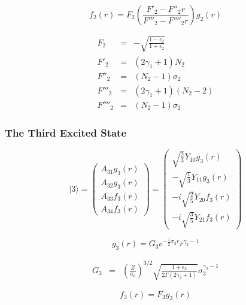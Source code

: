 \documentclass[a4paper,titlepage]{report}
\newcommand{\ket}[1]{|#1 \rangle}
\begin{document}
\begin{equation}
	\boxed{
		f_2(r) = F_2 
				 \left(
				 	\frac{F'_2 - F''_2 r}{F'''_2 - F''''_2 r}
				 \right) g_2(r)
	}
\end{equation}

\begin{eqnarray*}
	F_2		& = & -\sqrt{\frac{1-\epsilon_2}{1+\epsilon_2}} \\
	F'_2	& = & (2\gamma_1 + 1)N_2 \\
	F''_2 	& = & (N_2 - 1)\sigma_2 \\
	F'''_2 	& = & (2\gamma_1 + 1)(N_2 - 2) \\
	F''''_2 & = & (N_2 - 1)\sigma_2
\end{eqnarray*}

		\subsubsection{The Third Excited State}
\begin{equation}
	\ket{3} = 
		\left(
			\begin{array}{c}
				A_{31} g_3(r) \\
				A_{32} g_3(r) \\
				A_{33} f_3(r) \\
				A_{34} f_3(r)
			\end{array}
		\right)
		=
		\left(
			\begin{array}{c}
				\sqrt{\frac{2}{3}} Y_{10} g_3(r) \\
			   -\sqrt{\frac{1}{3}} Y_{11} g_3(r) \\
			 -i \sqrt{\frac{2}{5}} Y_{20} f_3(r) \\
			 -i \sqrt{\frac{3}{5}} Y_{21} f_3(r)
			\end{array}
		\right)
\end{equation}

\begin{equation}
	\boxed{
		g_3(r) = G_3 e^{-\frac{1}{2}\sigma_3 r}	r^{\gamma_2 - 1} 
	 }
\end{equation}

\begin{eqnarray*}
	G_3 & = & 	\left( \frac{Z}{a_0} \right)^{3/2}
			  \sqrt{
			  	\frac{1 + \epsilon_3}{2\Gamma(2\gamma_2 + 1)}
			  }
			  \sigma_3^{\gamma_2 - 1}
\end{eqnarray*}

\begin{equation}
	\boxed{
		f_3(r) = F_3 g_3(r)
	}
\end{equation}
\end{document}
